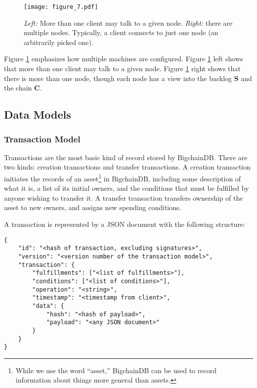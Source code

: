 \begin{figure}[!ht]
  \centering
  \texttt{[image: figure\_7.pdf]}
  \caption{\textit{Left:} More than one client may talk to a given node.
  \textit{Right:} there are multiple nodes. Typically, a client connects to just one node (an arbitrarily picked one).}
  \label{fig:bigchaindb_architecture_sharding}
\end{figure}

Figure \ref{fig:bigchaindb_architecture_sharding} emphasizes how multiple machines are configured.
Figure \ref{fig:bigchaindb_architecture_sharding} left shows that more than one client may talk to a given node.
Figure \ref{fig:bigchaindb_architecture_sharding} right shows that there is more than one node, though each node has a view into the backlog $\mathbf{S}$ and the chain $\mathbf{C}$.


\subsection{Data Models}\label{subsec:bigchaindb:models}
\subsubsection{Transaction Model}
Transactions are the most basic kind of record stored by BigchainDB. There are two kinds: creation transactions and transfer transactions. A creation transaction initiates the records of an asset\footnote{While we use the word ``asset,'' BigchainDB can be used to record information about things more general than assets.} in BigchainDB, including some description of what it is, a list of its initial owners, and the conditions that must be fulfilled by anyone wishing to transfer it. A transfer transaction transfers ownership of the asset to new owners, and assigns new spending conditions.

A transaction is represented by a JSON document with the following structure:

\begin{lstlisting}[style=json]
{
    "id": "<hash of transaction, excluding signatures>",
    "version": "<version number of the transaction model>",
    "transaction": {
        "fulfillments": ["<list of fulfillments>"],
        "conditions": ["<list of conditions>"],
        "operation": "<string>",
        "timestamp": "<timestamp from client>",
        "data": {
            "hash": "<hash of payload>",
            "payload": "<any JSON document>"
        }
    }
}
\end{lstlisting}

